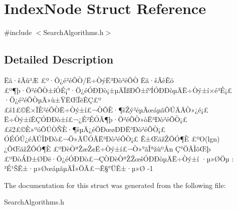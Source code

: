 \hypertarget{struct_index_node}{}\section{Index\+Node Struct Reference}
\label{struct_index_node}


{\ttfamily \#include $<$Search\+Algorithms.\+h$>$}



\subsection{Detailed Description}
Ëã·šÃû³Æ £º·Ö¿é²éÕÒ/Ë÷ÒýË³Ðò²éÕÒ Ëã·šÃèÊö £º¶þ·Ö²éÕÒ±íÓÉ¡°·Ö¿éÓÐÐò¡±µÄÏßÐÔ±íºÍÓÐÐòµÄË÷Òý±í×é³É¡£ ·Ö¿é²éÕÒµÄ»ù±ŸËŒÏëÊÇ£º £š1£©Ê×ÏÈ²éÕÒË÷Òý±í£¬ÒÔÈ·¶šŽý²éµÄœáµãÔÚÄÄÒ»¿é¡£ Ë÷Òý±íÊÇÓÐÐò±í£¬¿É²ÉÓÃ¶þ·Ö²éÕÒ»òË³Ðò²éÕÒ¡£ £š2£©È»ºóÔÚÒÑÈ·¶šµÄ¿éÖÐœøÐÐË³Ðò²éÕÒ¡£ ÓÉÓÚ¿éÄÚÎÞÐò£¬Ö»ÄÜÓÃË³Ðò²éÕÒ¡£ Ê±ŒäžŽÔÓ¶È £º\+O(lgn) ¿ÕŒäžŽÔÓ¶È £ºÐèÒªŽæŽ¢Ë÷Òý±í£¬Ò»°ãÎªžùºÅn Ç°ÖÃÌõŒþ £ºÐòÁÐ±ØÐë·Ö¿éÓÐÐò£¬ÇÒÐèÒªŽŽœšÓÐÐòµÄË÷Òý±í ·µ»ØÖµ \+: ³É¹ŠÊ±·µ»ØœáµãµÄÎ»ÖÃ£¬Ê§°ÜÊ±·µ»Ø -\/1 

The documentation for this struct was generated from the following file\+:\begin{DoxyCompactItemize}
\item 
Search\+Algorithms.\+h\end{DoxyCompactItemize}
